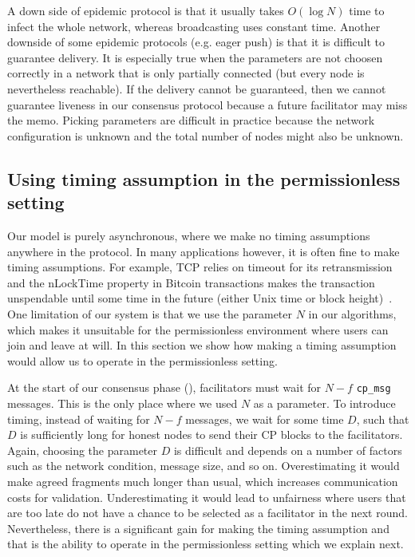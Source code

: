 A down side of epidemic protocol is that it usually takes $O(\log N)$ time to infect the whole network,
whereas broadcasting uses constant time.
Another downside of some epidemic protocols (e.g. eager push) is that it is difficult to guarantee delivery.
It is especially true when the parameters are not choosen correctly in a network that is only partially connected (but every node is nevertheless reachable).
If the delivery cannot be guaranteed, 
then we cannot guarantee liveness in our consensus protocol because a future facilitator may miss the memo.
Picking parameters are difficult in practice because the network configuration is unknown and the total number of nodes might also be unknown.


\subsection{Using timing assumption in the permissionless setting}
Our model is purely asynchronous, where we make no timing assumptions anywhere in the protocol.
In many applications however, it is often fine to make timing assumptions.
For example, TCP relies on timeout for its retransmission and the nLockTime property in Bitcoin transactions makes the transaction unspendable until some time in the future (either Unix time or block height)~\cite{bitcoindevguide}.
One limitation of our system is that we use the parameter $N$ in our algorithms, which makes it unsuitable for the permissionless environment where users can join and leave at will.
In this section we show how making a timing assumption would allow us to operate in the permissionless setting.

At the start of our consensus phase (), facilitators must wait for $N-f$ \texttt{cp\_msg} messages.
This is the only place where we used $N$ as a parameter.
To introduce timing, instead of waiting for $N-f$ messages, we wait for some time $D$,
such that $D$ is sufficiently long for honest nodes to send their CP blocks to the facilitators.
Again, choosing the parameter $D$ is difficult and depends on a number of factors such as the network condition, message size, and so on.
Overestimating it would make agreed fragments much longer than usual, which increases communication costs for validation.
Underestimating it would lead to unfairness where users that are too late do not have a chance to be selected as a facilitator in the next round.
Nevertheless, there is a significant gain for making the timing assumption and that is the ability to operate in the permissionless setting which we explain next.

